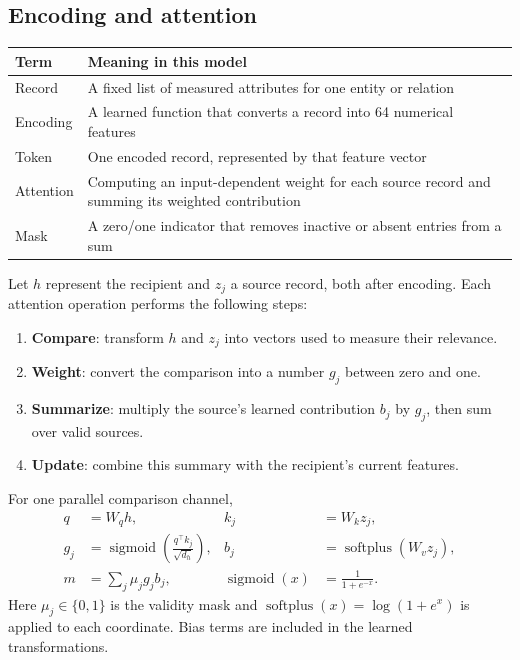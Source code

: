 \documentclass[11pt,a4paper]{article}
\begin{document}
\subsection{Encoding and attention}
\begin{center}
\begin{tabularx}{\linewidth}{@{}lX@{}}
\toprule
Term & Meaning in this model \\
\midrule
Record & A fixed list of measured attributes for one entity or relation \\
Encoding & A learned function that converts a record into 64 numerical features \\
Token & One encoded record, represented by that feature vector \\
Attention & Computing an input-dependent weight for each source record and summing its weighted contribution \\
Mask & A zero/one indicator that removes inactive or absent entries from a sum \\
\bottomrule
\end{tabularx}
\end{center}

Let $h$ represent the recipient and $z_j$ a source record, both after encoding.
Each attention operation performs the following steps:
\begin{enumerate}
\item \textbf{Compare}: transform $h$ and $z_j$ into vectors used to measure their relevance.
\item \textbf{Weight}: convert the comparison into a number $g_j$ between zero and one.
\item \textbf{Summarize}: multiply the source's learned contribution $b_j$ by $g_j$, then sum over valid sources.
\item \textbf{Update}: combine this summary with the recipient's current features.
\end{enumerate}

For one parallel comparison channel,
\begin{align*}
q&=W_qh, & k_j&=W_kz_j,\\
g_j&=\operatorname{sigmoid}\!\left(\frac{q^\top k_j}{\sqrt{d_h}}\right),
& b_j&=\operatorname{softplus}(W_vz_j),\\
m&=\sum_j\mu_j g_j b_j,
& \operatorname{sigmoid}(x)&=\frac{1}{1+e^{-x}}.
\end{align*}
Here $\mu_j\in\{0,1\}$ is the validity mask and
$\operatorname{softplus}(x)=\log(1+e^x)$ is applied to each coordinate.
Bias terms are included in the learned transformations.
\end{document}
